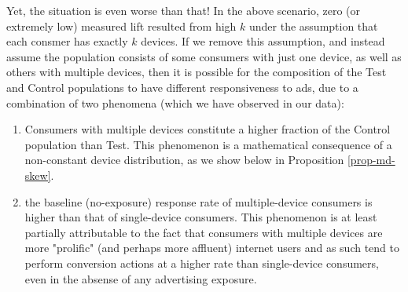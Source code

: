 \documentclass[11pt,a4paper]{article}
\theoremstyle{definition}
\theoremstyle{remark}
\theoremstyle{definition}
\theoremstyle{definition}
\theoremstyle{definition}
\theoremstyle{definition}
\theoremstyle{definition}
\theoremstyle{definition}
\begin{document}
Yet, the situation is even worse than that! In the above scenario, zero (or extremely low) measured lift resulted from high $k$ under the assumption that each consmer has exactly $k$ devices. If we remove this assumption, and instead assume the population consists of some consumers with just one device, as well as others with multiple devices, then it is possible for the composition of the Test and Control populations to have different responsiveness to ads, due to a combination of two phenomena (which we have observed in our data):
\begin{enumerate}
\item Consumers with multiple devices constitute a higher fraction of the Control population than Test. This phenomenon is a mathematical consequence of a non-constant device distribution, as we show below in Proposition \ref{prop-md-skew}.
\item the baseline (no-exposure) response rate of multiple-device consumers is higher than that of single-device consumers. This phenomenon is at least partially attributable to the fact that consumers with multiple devices are more "prolific" (and perhaps more affluent) internet users and as such tend to perform conversion actions at a higher rate than single-device consumers, even in the absense of any advertising exposure.
\end{enumerate}
\end{document}

